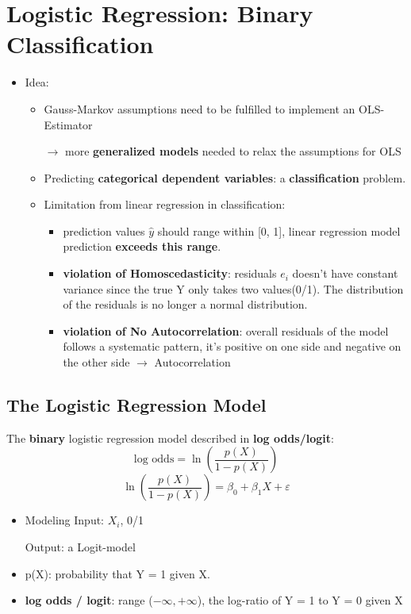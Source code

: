 \section{Logistic Regression: Binary Classification}
\begin{itemize}
	\item Idea:	
	\begin{itemize}
		\item Gauss-Markov assumptions need to be fulfilled to implement an OLS-Estimator
		
		$\rightarrow$ more \textbf{generalized models} needed to relax the assumptions for OLS
		
		\item Predicting \textbf{categorical dependent variables}: a \textbf{classification} problem.
		\item Limitation from linear regression in classification:
		\begin{itemize}
			\item prediction values $\hat{y}$ should range within [0, 1], linear regression model prediction \textbf{exceeds this range}.
			\item \textbf{violation of Homoscedasticity}: residuals $e_i$ doesn't have constant variance since the true Y only takes two values(0/1). The distribution of the residuals is no longer a normal distribution.
			\item \textbf{violation of No Autocorrelation}: overall residuals of the model follows a systematic pattern, it's positive on one side and negative on the other side $\rightarrow$ Autocorrelation
		\end{itemize}
	\end{itemize}
\end{itemize}

\subsection{The Logistic Regression Model}
The \textbf{binary} logistic regression model described in \textbf{log odds/logit}:
$$\text{log odds} = \ln(\frac{p(X)}{1 - p(X)}) $$
$$\ln(\frac{p(X)}{1 - p(X)}) = \beta_0 + \beta_1 X + \varepsilon$$
\begin{itemize}
	\item Modeling Input: $X_i$, 0/1
	
		  Output: a Logit-model	  
	\item p(X): probability that Y = 1 given X.
	\item \textbf{log odds / logit}: range ($-\infty, +\infty$), the log-ratio of Y = 1 to Y = 0 given X
\end{itemize}


